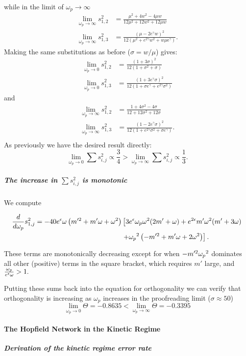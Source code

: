 while in the limit of $\omega_p\to\infty$ 
\begin{eqnarray*}
\lim_{\omega_p\to\infty}{s^2_{1,2}}&=\frac{\mu ^2+4 w^2-4 \mu  w}{12 \mu ^2+12 w^2+12 \mu  w}\\
\lim_{\omega_p\to\infty}{s^2_{1,3}}&=\frac{\left(\mu -2 e^{\gamma } w\right)^2}{12 \left(\mu ^2+e^{2 \gamma } w^2+w \text{$\mu $e}^{\gamma }\right)}.
\end{eqnarray*}
Making the same substitutions as before ($\sigma=w/\mu$) gives:
\begin{eqnarray*}
\lim_{\omega_p\to0}{s^2_{1,2}}&=\frac{(1 +3 \sigma)^2}{12 \left(1+\sigma^2+\sigma\right)}\\
\lim_{\omega_p\to0}{s^2_{1,3}}&=\frac{\left(1 +3 e^{\gamma } \sigma\right)^2}{12 \left(1+\sigma e^{\gamma}+e^{2\gamma} \sigma^2\right)}
\end{eqnarray*}
and
\begin{eqnarray*}
\lim_{\omega_p\to\infty}{s^2_{1,2}}&=\frac{1+4 \sigma^2-4 \sigma}{12 +12 \sigma^2+12 \sigma}\\
\lim_{\omega_p\to\infty}{s^2_{1,3}}&=\frac{\left(1 -2 e^{\gamma } \sigma\right)^2}{12 \left(1+e^{2 \gamma } \sigma^2+\sigma e^{\gamma }\right)}.\\
\end{eqnarray*}
As previously we have the desired result directly:
\[
\lim_{\omega_p\to0}\sum{s^2_{i,j}}\propto\frac{3}{4}>\lim_{\omega_p\to\infty}\sum{s^2_{i,j}}\propto\frac{1}{3}.
\]
\subparagraph{The increase in $\sum{s^2_{i,j}}$ is monotonic}
We compute
\begin{widetext}
\[
\begin{aligned}
\frac{d}{d\omega_p}{s^2_{1,j}} =  -40 e^\epsilon \omega \left(m'^2+m' \omega+\omega^2\right) &\left[3 e^\epsilon {\omega_p} \omega^2 (2 m'+\omega)+e^{2 \epsilon} m' \omega^2 (m'+3 \omega)\right.\\
&\left. +{\omega_p}^2
   \left(-m'^2+m' \omega+2 \omega^2\right)\right].
\end{aligned}
\]
\end{widetext}
These terms are monotonically decreasing except for when $-m'^2{\omega_p}^2$ dominates all other (positive) terms in the square bracket, which requires $m'$ large, and $\frac{{\omega_p}}{e^\epsilon \omega}> 1.$

Putting these sums back into the equation for orthogonality we can verify that orthogonality is increasing as $\omega_p$ increases in the proofreading limit ($\sigma\approx50$)
\[
\lim_{\omega_p\to0}\Theta=-0.8635<\lim_{\omega_p\to\infty}\Theta=-0.3395
\]

\paragraph{The Hopfield Network in the Kinetic Regime}
\subparagraph{Derivation of the kinetic regime error rate}

